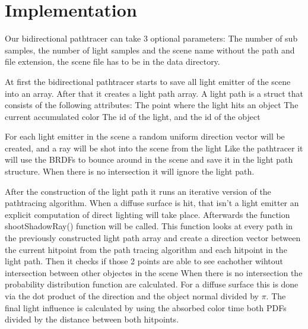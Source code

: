 \section{Implementation}
Our bidirectional pathtracer can take 3 optional parameters: The number of sub samples, the number of light samples
and the scene name without the path and file extension, the scene file has to be in the data directory.

At first the bidirectional pathtracer starts to save all light emitter of the scene into an array.
After that it creates a light path array. A light path is a struct that consists of the following attributes:
The point where the light hits an object
The current accumulated color
The id of the light, and the id of the object

For each light emitter in the scene a random uniform direction vector will be created, and a ray will be shot into the scene from the light
Like the pathtracer it will use the BRDFs to bounce around in the scene and save it in the light path structure. When there is no intersection it will ignore the light path.

After the construction of the light path it runs an iterative version of the pathtracing algorithm. When a diffuse surface is hit, that isn't a light emitter an explicit computation of direct lighting will take place.
Afterwards the function shootShadowRay() function will be called.
This function looks at every path in the previously constructed light path array and create a direction vector between the current hitpoint from the path tracing algorithm and each hitpoint in the light path.
Then it checks if those 2 points are able to see eachother wihtout intersection between other objectes in the scene
When there is no intersection the probability distribution function are calculated. For a diffuse surface this is done via the dot product of the direction and the object normal divided by \(\pi\).
The final light influence is calculated by using the absorbed color time both PDFs divided by the distance between both hitpoints.

